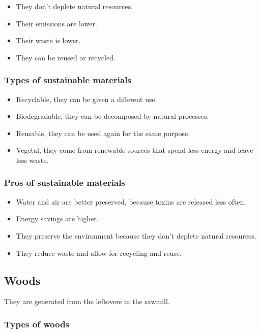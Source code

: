 \documentclass{article}
\begin{document}
\begin{itemize}
    \item They don't deplete natural resources.
    \item Their emissions are lower.
    \item Their waste is lower.
    \item They can be reused or recycled.
\end{itemize}

\subsubsection*{Types of sustainable materials}

\begin{itemize}
    \item Recyclable, they can be given a different use.
    \item Biodegradable, they can be decomposed by natural processes.
    \item Reusable, they can be used again for the same purpose.
    \item Vegetal, they come from renewable sources that spend less energy and
    leave less waste.
\end{itemize}

\subsubsection*{Pros of sustainable materials}

\begin{itemize}
    \item Water and air are better preserved, because toxins are released less
    often.
    \item Energy savings are higher.
    \item They preserve the environment because they don't deplete natural
    resources.
    \item They reduce waste and allow for recycling and reuse.
\end{itemize}

\subsection*{Woods}

They are generated from the leftovers in the sawmill.

\subsubsection*{Types of woods}
\end{document}
